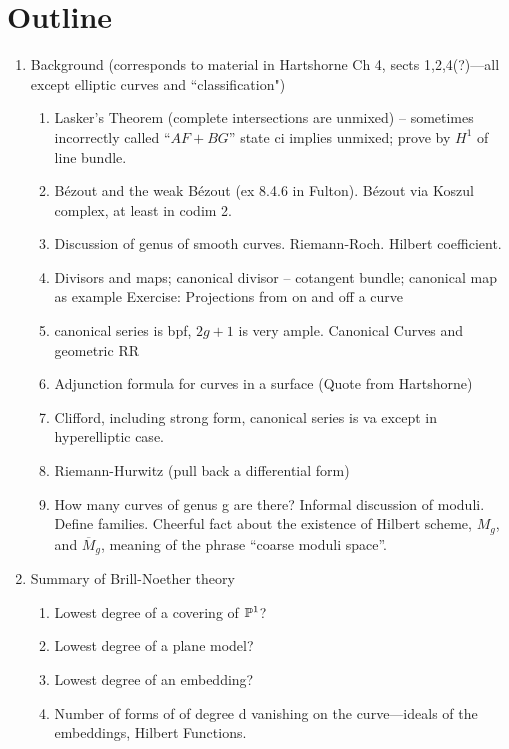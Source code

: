 \documentclass[12pt, leqno]{article}
\begin{document}
\section*{Outline}
 \begin{enumerate}

\item Background (corresponds to material in Hartshorne Ch 4, sects 1,2,4(?)---all except elliptic curves and ``classification")
\begin{enumerate}

\item Lasker's Theorem (complete intersections are unmixed) -- sometimes incorrectly called ``$AF+BG$''
state ci implies unmixed; prove by $H^1$ of line bundle.

\item B\'ezout and the  weak B\'ezout (ex 8.4.6 in Fulton).
B\'ezout via Koszul complex, at least in codim 2.

\item Discussion of genus of smooth curves. Riemann-Roch. Hilbert coefficient.

\item Divisors and maps; canonical divisor -- cotangent bundle; canonical map as example
Exercise: Projections from on and off a curve

\item canonical series is bpf, $2g+1$ is very ample. Canonical Curves and geometric RR

\item Adjunction formula for curves in a surface (Quote from Hartshorne)

\item Clifford, including strong form, canonical series is va except in hyperelliptic case.

\item Riemann-Hurwitz (pull back a differential form)

\item How many curves of genus g are there? Informal discussion of moduli. Define families. Cheerful fact about the existence of  Hilbert scheme, $M_g$, and $\overline M_g$, meaning of the phrase ``coarse moduli space''.

\end{enumerate}


\item Summary of Brill-Noether theory
\begin{enumerate}
 \item Lowest degree of a covering of ${\mathbb P}^1$?
 \item Lowest degree of a plane model?
 \item Lowest degree of an embedding?
 \item Number of forms of of degree d vanishing on the curve---ideals of the embeddings, Hilbert Functions.
\end{enumerate}


\end{enumerate}
\end{document}
